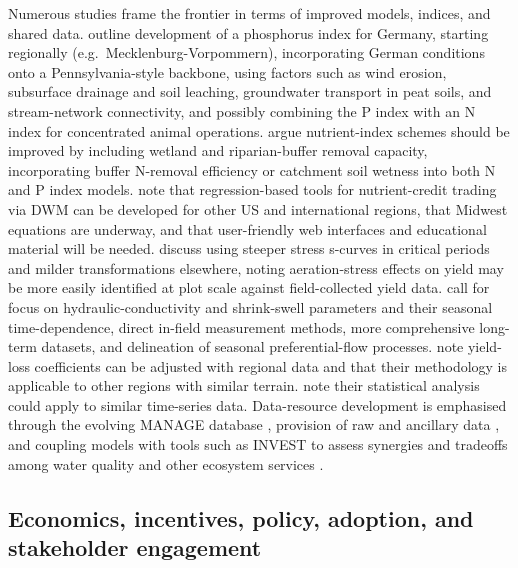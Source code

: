 \documentclass[11pt]{article}
\begin{document}
Numerous studies frame the frontier in terms of improved models, indices, and shared data. \textcite{Buczko2007} outline development of a phosphorus index for Germany, starting regionally (e.g.\ Mecklenburg-Vorpommern), incorporating German conditions onto a Pennsylvania-style backbone, using factors such as wind erosion, subsurface drainage and soil leaching, groundwater transport in peat soils, and stream-network connectivity, and possibly combining the P index with an N index for concentrated animal operations. \textcite{Pärn2012} argue nutrient-index schemes should be improved by including wetland and riparian-buffer removal capacity, incorporating buffer N-removal efficiency or catchment soil wetness into both N and P index models. \textcite{Negm2016} note that regression-based tools for nutrient-credit trading via DWM can be developed for other US and international regions, that Midwest equations are underway, and that user-friendly web interfaces and educational material will be needed. \textcite{Wang2016} discuss using steeper stress s-curves in critical periods and milder transformations elsewhere, noting aeration-stress effects on yield may be more easily identified at plot scale against field-collected yield data. \textcite{Boivin2006} call for focus on hydraulic-conductivity and shrink-swell parameters and their seasonal time-dependence, direct in-field measurement methods, more comprehensive long-term datasets, and delineation of seasonal preferential-flow processes. \textcite{ROBINSON1992} note yield-loss coefficients can be adjusted with regional data and that their methodology is applicable to other regions with similar terrain. \textcite{Adeuya2012} note their statistical analysis could apply to similar time-series data. Data-resource development is emphasised through the evolving MANAGE database \parencite{Hertzberger2019}, provision of raw and ancillary data \parencite{Chatterjee2020b}, and coupling models with tools such as INVEST to assess synergies and tradeoffs among water quality and other ecosystem services \parencite{McLellan2015}.

\subsection{Economics, incentives, policy, adoption, and stakeholder engagement}
\end{document}
